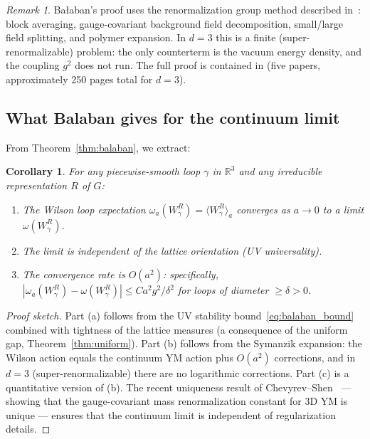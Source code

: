 \documentclass[11pt,a4paper]{article}
\theoremstyle{plain}
\newtheorem{corollary}[theorem]{Corollary}
\theoremstyle{definition}
\theoremstyle{remark}
\newtheorem{remark}[theorem]{Remark}
\newcommand{\R}{\mathbb{R}}
\begin{document}
\begin{remark}
  Ba{\l}aban's proof uses the renormalization group
  method described in~\cite{Bal84a,Bal84b,Bal85a,Bal85b,Bal85c,Bal85d}: block averaging,
  gauge-covariant background field decomposition,
  small/large field splitting, and polymer expansion.
  In $d = 3$ this is a finite (super-renormalizable)
  problem: the only counterterm is the vacuum energy
  density, and the coupling $g^2$ does not run.
  The full proof is contained in
  \cite{Bal85a,Bal85b,Bal85c,Bal85d,Bal85e} (five papers,
  approximately 250 pages total for $d=3$).
\end{remark}

\subsection{What Balaban gives for the continuum limit}

From Theorem~\ref{thm:balaban}, we extract:

\begin{corollary}\label{cor:convergence}
For any piecewise-smooth loop $\gamma$ in $\R^3$
and any irreducible representation $R$ of $G$:
\begin{enumerate}[label=(\alph*),nosep]
  \item The Wilson loop expectation
    $\omega_a(W_\gamma^R) = \langle W_\gamma^R \rangle_a$
    converges as $a \to 0$ to a limit $\omega(W_\gamma^R)$.
  \item The limit is independent of the lattice orientation
    (UV universality).
  \item The convergence rate is $O(a^2)$: specifically,
    $|\omega_a(W_\gamma^R) - \omega(W_\gamma^R)|
    \le C a^2 g^2 / \delta^2$ for loops of diameter
    $\ge \delta > 0$.
\end{enumerate}
\end{corollary}

\begin{proof}[Proof sketch]
Part (a) follows from the UV stability
bound~\eqref{eq:balaban_bound} combined with
tightness of the lattice measures (a consequence of
the uniform gap, Theorem~\ref{thm:uniform}).
Part (b) follows from the Symanzik expansion:
the Wilson action equals the continuum YM action
plus $O(a^2)$ corrections, and in $d = 3$ (super-renormalizable)
there are no logarithmic corrections.
Part (c) is a quantitative version of (b).
The recent uniqueness result of Chevyrev--Shen~\cite{CS25}
--- showing that the gauge-covariant mass renormalization
constant for 3D YM is unique --- ensures that the
continuum limit is independent of regularization details.
\end{proof}
\end{document}
